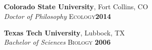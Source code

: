 \documentclass[margin,line]{resume}
\begin{document}
\begin{resume}
    \section{\textmd{\textsf{\color{MidnightBlue}{Education}}}}

    \textbf{Colorado State University}, Fort Collins, CO \vspace{1mm}\\\vspace{1mm}%
    \textsl{Doctor of Philosophy} \textsc{Ecology}\hfill \textbf{2014}\vspace{-3mm}\\\vspace{-1mm}%
    
    \textbf{Texas Tech University}, Lubbock, TX \vspace{1mm}\\\vspace{1mm}%
    \textsl{Bachelor of Sciences} \textsc{Biology} \hfill \textbf{2006}\vspace{-3mm}\\\vspace{-1mm}%
    

\end{resume}
\end{document}
